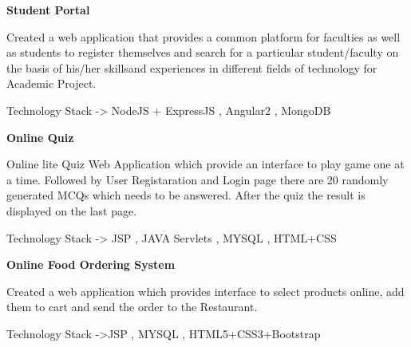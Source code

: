 \documentclass[a4paper]{article}
\begin{document}
\textbf{Student Portal
\href{https://github.com/orton009}{\faGithub}}
\vspace{-1mm}
\begin{itemize}
	\small{\item Created a web application that provides a common platform
for faculties as well as students to register themselves and search for a particular student/faculty on the basis of his/her skillsand experiences in different fields of technology for Academic Project.  }
	\small{\item Technology Stack -> NodeJS + ExpressJS , Angular2 , MongoDB  }
	\vspace{-1mm}
\end{itemize}

\textbf{Online Quiz
\href{https://github.com/orton009}{\faGithub}}
\vspace{-1mm}
\begin{itemize}
	\small{\item Online lite Quiz Web Application which provide an interface to play game one at a time. Followed by User Registaration and Login page there are 20 randomly generated MCQs which needs to be answered. After the quiz the result is displayed on the last page.}
	\small{\item Technology Stack -> JSP , JAVA Servlets , MYSQL , HTML+CSS  }
	\vspace{-1mm}
\end{itemize}

\textbf{Online Food Ordering System
\href{https://github.com/orton009}{\faGithub}}
\vspace{-1mm}
\begin{itemize}
	\small{\item Created a web application which provides interface to select products online, add them to cart and send the order to the Restaurant. }
	\small{\item Technology Stack ->JSP , MYSQL , HTML5+CSS3+Bootstrap}
	\vspace{-1mm}
\end{itemize}
\end{document}
